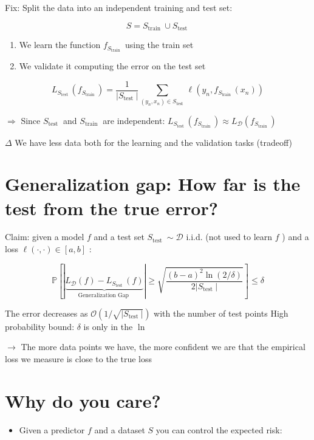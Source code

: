 \documentclass[10pt]{article}
\begin{document}
Fix: Split the data into an independent training and test set:

$$
S=S_{\text {train }} \cup S_{\text {test }}
$$

\begin{enumerate}
  \item We learn the function $f_{S_{\text {train }}}$ using the train set

  \item We validate it computing the error on the test set

\end{enumerate}

$$
L_{S_{\text {test }}}\left(f_{S_{\text {train }}}\right)=\frac{1}{\left|S_{\text {test }}\right|} \sum_{\left(y_{n}, x_{n}\right) \in S_{\text {test }}} \ell\left(y_{n}, f_{S_{\text {train }}}\left(x_{n}\right)\right)
$$

$\Rightarrow$ Since $S_{\text {test }}$ and $S_{\text {train }}$ are independent: $L_{S_{\text {test }}}\left(f_{S_{\text {train }}}\right) \approx L_{\mathscr{D}}\left(f_{S_{\text {train }}}\right)$

$\Delta$ We have less data both for the learning and the validation tasks (tradeoff)

\section*{Generalization gap: How far is the test from the true error?}
Claim: given a model $f$ and a test set $S_{\text {test }} \sim \mathscr{D}$ i.i.d. (not used to learn $f$ ) and a loss $\ell(\cdot, \cdot) \in[a, b]$ :

$$
\mathbb{P}\left[|\underbrace{L_{\mathscr{D}}(f)-L_{S_{\text {test }}}(f)}_{\text {Generalization Gap }}| \geq \sqrt{\frac{(b-a)^{2} \ln (2 / \delta)}{2\left|S_{\text {test }}\right|}}\right] \leq \delta
$$

The error decreases as $\mathcal{O}\left(1 / \sqrt{\left|S_{\text {test }}\right|}\right)$ with the number of test points High probability bound: $\delta$ is only in the $\ln$

$\rightarrow$ The more data points we have, the more confident we are that the empirical loss we measure is close to the true loss

\section*{Why do you care?}
\begin{itemize}
  \item Given a predictor $f$ and a dataset $S$ you can control the expected risk:
\end{itemize}
\end{document}
